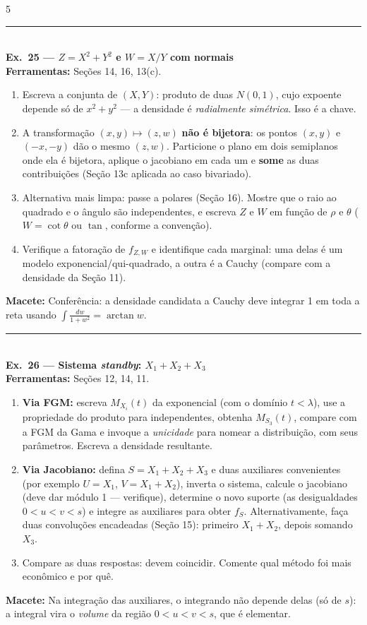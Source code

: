 \documentclass[a4paper,8pt]{extarticle}
\newcommand{\tit}[1]{\vspace{2pt}\textcolor{azul}{\rule{\linewidth}{0.6pt}}\\[1pt]\textbf{\textcolor{azul}{#1}}\\[1pt]}
\newcommand{\mac}[1]{\textcolor{verde}{\textbf{Macete:}} #1\par}
\newcommand{\ferr}[1]{\textbf{Ferramentas:} #1\par}
\begin{document}
\begin{multicols*}{5}
\tit{Ex.\ 25 — $Z=X^2+Y^2$ e $W=X/Y$ com normais}
\ferr{Seções 14, 16, 13(c).}
\begin{enumerate}
\item Escreva a conjunta de $(X,Y)$: produto de duas $N(0,1)$, cujo expoente depende só de $x^2+y^2$ — a densidade é \emph{radialmente simétrica}. Isso é a chave.
\item A transformação $(x,y)\mapsto(z,w)$ \textbf{não é bijetora}: os pontos $(x,y)$ e $(-x,-y)$ dão o mesmo $(z,w)$. Particione o plano em dois semiplanos onde ela é bijetora, aplique o jacobiano em cada um e \textbf{some} as duas contribuições (Seção 13c aplicada ao caso bivariado).
\item Alternativa mais limpa: passe a polares (Seção 16). Mostre que o raio ao quadrado e o ângulo são independentes, e escreva $Z$ e $W$ em função de $\rho$ e $\theta$ ($W=\cot\theta$ ou $\tan$, conforme a convenção).
\item Verifique a fatoração de $f_{Z,W}$ e identifique cada marginal: uma delas é um modelo exponencial/qui-quadrado, a outra é a Cauchy (compare com a densidade da Seção 11).
\end{enumerate}
\mac{Conferência: a densidade candidata a Cauchy deve integrar 1 em toda a reta usando $\int \frac{dw}{1+w^2}=\arctan w$.}

\tit{Ex.\ 26 — Sistema \emph{standby}: $X_1+X_2+X_3$}
\ferr{Seções 12, 14, 11.}
\begin{enumerate}
\item[(a)] \textbf{Via FGM:} escreva $M_{X_i}(t)$ da exponencial (com o domínio $t<\lambda$), use a propriedade do produto para independentes, obtenha $M_{S_3}(t)$, compare com a FGM da Gama e invoque a \emph{unicidade} para nomear a distribuição, com seus parâmetros. Escreva a densidade resultante.
\item[(b)] \textbf{Via Jacobiano:} defina $S=X_1+X_2+X_3$ e duas auxiliares convenientes (por exemplo $U=X_1$, $V=X_1+X_2$), inverta o sistema, calcule o jacobiano (deve dar módulo 1 — verifique), determine o novo suporte (as desigualdades $0<u<v<s$) e integre as auxiliares para obter $f_S$. Alternativamente, faça duas convoluções encadeadas (Seção 15): primeiro $X_1+X_2$, depois somando $X_3$.
\item Compare as duas respostas: devem coincidir. Comente qual método foi mais econômico e por quê.
\end{enumerate}
\mac{Na integração das auxiliares, o integrando não depende delas (só de $s$): a integral vira o \emph{volume} da região $0<u<v<s$, que é elementar.}


\end{multicols*}
\end{document}

